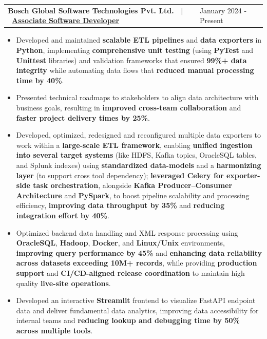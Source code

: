 \documentclass[a4paper,10pt]{article}
\newenvironment{jobshort}[2]
    {
    \noindent\begin{tabularx}{\linewidth}{l X r}
    	\textbf{#1} & \hfill #2 \\[-10pt] %
    \end{tabularx}
    }
    {
    \vspace{-3pt} %
    }
\begin{document}
\begin{jobshort}{Bosch Global Software Technologies Pvt. Ltd. \ $|$ \ \href{https://drive.google.com/file/d/1hNmzpBB9Um7AT7RnKK6kc4xhsKgf8IDf/view?usp=sharing}{Associate Software Developer}}{January 2024 - Present}
    \begin{itemize}[itemsep=-5pt]
        \item Developed and maintained \textbf{scalable ETL pipelines} and \textbf{data exporters} in \textbf{Python}, implementing \textbf{comprehensive unit testing} (using \textbf{PyTest} and \textbf{Unittest} libraries) and validation frameworks that ensured \textbf{99\%+ data integrity} while automating data flows that \textbf{reduced manual processing time by 40\%}.
        \item Presented technical roadmaps to stakeholders to align data architecture with business goals, resulting in \textbf{improved cross-team collaboration} and \textbf{faster project delivery times by 25\%}.
        \item Developed, optimized, redesigned and reconfigured multiple data exporters to work within a \textbf{large-scale ETL framework}, enabling \textbf{unified ingestion into several target systems} (like HDFS, Kafka topics, OracleSQL tables, and Splunk indexes) using \textbf{standardized data-models} and a \textbf{harmonizing layer} (to support cross tool dependency); \textbf{leveraged Celery for exporter-side task orchestration}, alongside \textbf{Kafka Producer–Consumer Architecture} and \textbf{PySpark}, to boost pipeline scalability and processing efficiency, \textbf{improving data throughput by 35\%} and \textbf{reducing integration effort by 40\%}.
        \item Optimized backend data handling and XML response processing using \textbf{OracleSQL}, \textbf{Hadoop}, \textbf{Docker}, and \textbf{Linux/Unix} environments, \textbf{improving query performance by 45\%} and \textbf{enhancing data reliability across datasets exceeding 10M+ records}, while providing \textbf{production support} and \textbf{CI/CD-aligned release coordination} to maintain high quality \textbf{live-site operations}.
        \item Developed an interactive \textbf{Streamlit} frontend to visualize FastAPI endpoint data and deliver fundamental data analytics, improving data accessibility for internal teams and \textbf{reducing lookup and debugging time by 50\% across multiple tools}.
    \end{itemize}
\end{jobshort}
\end{document}
